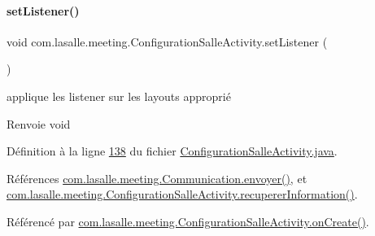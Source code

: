 \paragraph{\texorpdfstring{set\+Listener()}{setListener()}}
{\footnotesize\ttfamily void com.\+lasalle.\+meeting.\+Configuration\+Salle\+Activity.\+set\+Listener (\begin{DoxyParamCaption}{ }\end{DoxyParamCaption})}



applique les listener sur les layouts approprié 

\begin{DoxyReturn}{Renvoie}
void 
\end{DoxyReturn}


Définition à la ligne \hyperlink{_configuration_salle_activity_8java_source_l00138}{138} du fichier \hyperlink{_configuration_salle_activity_8java_source}{Configuration\+Salle\+Activity.\+java}.



Références \hyperlink{_communication_8java_source_l00161}{com.\+lasalle.\+meeting.\+Communication.\+envoyer()}, et \hyperlink{_configuration_salle_activity_8java_source_l00164}{com.\+lasalle.\+meeting.\+Configuration\+Salle\+Activity.\+recuperer\+Information()}.



Référencé par \hyperlink{_configuration_salle_activity_8java_source_l00066}{com.\+lasalle.\+meeting.\+Configuration\+Salle\+Activity.\+on\+Create()}.



